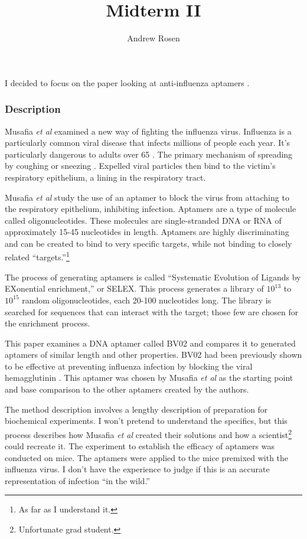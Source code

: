 \documentclass[10pt,a4paper]{article}
\author{Andrew Rosen}
\title{Midterm II}
\begin{document}
	\maketitle
	
	I decided to focus on the paper looking at anti-influenza aptamers  \cite{musafia2014designing}.
	
	
	\subsubsection*{Description}
	
	Musafia \textit{et al} examined a new way of fighting the influenza virus.
	Influenza is a particularly common viral disease that infects millions of people each year.
	It's particularly dangerous to adults over 65 \cite{centers2010estimates}.
	The primary mechanism of spreading  by coughing or sneezing \cite{stephenson2002epidemiology}.
	Expelled viral particles then bind to the victim's respiratory epithelium, a lining in the respiratory tract.
	
	Musafia \textit{et al} study the use of an aptamer to block the virus from attaching to the respiratory epithelium, inhibiting infection.
	Aptamers are a type of molecule called oligonucleotides.
	These molecules are single-stranded DNA or RNA of approximately 15-45 nucleotides in length. 
	Aptamers  are highly discriminating and can be created to bind to very specific targets, while not binding to closely related ``targets.''\footnote{As far as I understand it.}
	
	The process of generating aptamers is called ``Systematic Evolution of Ligands by EXonential enrichment,'' or SELEX.
	This process generates a library of $ 10^{13} $ to $ 10 ^{15} $ random oligonucleotides, each 20-100 nucleotides long.
	The library is searched for sequences that can interact with the target; those few are chosen for the enrichment process.
	
	This paper examines a DNA aptamer called BV02 and compares it to generated aptamers of similar length and other properties.
	BV02 had been previously shown to be effective at preventing influenza infection by blocking the viral hemagglutinin \cite{jeon2004dna}.
	This aptamer was chosen by Musafia \textit{et al} as the starting point and base comparison to the other aptamers created by the authors.
		
	The method description involves a lengthy description of preparation for biochemical experiments.  
	I won't pretend to understand the specifics, but this process describes how Musafia \textit{et al}  created their solutions and how a scientist\footnote{Unfortunate grad student.} could recreate it.
	The experiment to establish the efficacy of aptamers was conducted on mice.
	The aptamers were applied to the mice premixed with the influenza virus.
	I don't have the experience to judge if this is an accurate representation of infection ``in the wild.''
	
\end{document}

